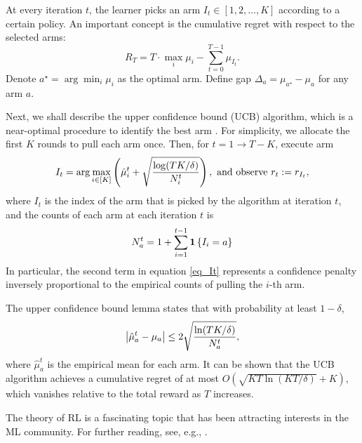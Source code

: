 At every iteration $t$, the learner picks an arm $I_t \in [1, 2, \dots, K]$ according to a certain policy.
An important concept is the cumulative regret with respect to the selected arms:
\[ R_T = T \cdot \max_i \mu_i - \sum_{t=0}^{T-1} \mu_{I_t}. \]
Denote $a^{\star} = \arg \min_i \mu_i$ as the optimal arm.
Define gap $\Delta_a = \mu_{a^{\star}} - \mu_a$ for any arm $a$.

Next, we shall describe the upper confidence bound (UCB) algorithm, which is a near-optimal procedure to identify the best arm \cite{daniel2018tutorial}.
For simplicity, we allocate the first $K$ rounds to pull each arm once.
Then, for $t = 1 \rightarrow T - K$, execute arm 
\begin{align}
    I_t = \arg \max_{i \in [K]} \left( \hat \mu_i^t + \sqrt{\frac {\log(TK / \delta)} {N_i^t}} \right), \text{ and observe } r_t := r_{I_t}, \label{eq_It}
\end{align}
where $I_t$ is the index of the arm that is picked by the algorithm at iteration $t$,
and the counts of each arm at each iteration $t$ is
\[ N_a^t = 1 + \sum_{i=1}^{t-1} \bm{1}\left\{I_i = a\right\} \]
In particular, the second term in equation \eqref{eq_It} represents a confidence penalty inversely proportional to the empirical counts of pulling the $i$-th arm.

The upper confidence bound lemma \citep{foster2023foundations} states that with probability at least $1 - \delta$,
\[ {\left| { \hat \mu_a^t - \mu_a } \right|} \le 2 \sqrt{ \frac {\ln(TK / \delta)} {N_a^t}  }, \]
where $\hat \mu_a^t$ is the empirical mean for each arm.
It can be shown that the UCB algorithm achieves a cumulative regret of at most $O(\sqrt{K T \ln (KT / \delta)} + K)$, which vanishes relative to the total reward as $T$ increases.

The theory of RL is a fascinating topic that has been attracting interests in the ML community.
For further reading, see, e.g., \cite{foster2023foundations,chi2025statistical}.
